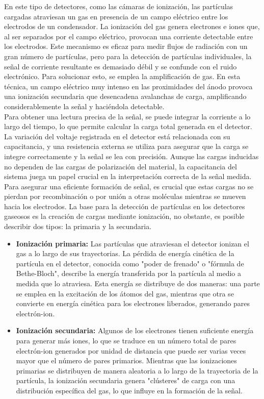 \documentclass{article}
\begin{document}
\noindent En este tipo de detectores, como las cámaras de ionización, las partículas cargadas atraviesan un gas en presencia de un campo eléctrico entre los electrodos de un condensador. La ionización del gas genera electrones e iones que, al ser separados por el campo eléctrico, provocan una corriente detectable entre los electrodos. Este mecanismo es eficaz para medir flujos de radiación con un gran número de partículas, pero para la detección de partículas individuales, la señal de corriente resultante es demasiado débil y se confunde con el ruido electrónico. Para solucionar esto, se emplea la amplificación de gas. En esta técnica, un campo eléctrico muy intenso en las proximidades del ánodo provoca una ionización secundaria que desencadena avalanchas de carga, amplificando considerablemente la señal y haciéndola detectable.\\

\noindent Para obtener una lectura precisa de la señal, se puede integrar la corriente a lo largo del tiempo, lo que permite calcular la carga total generada en el detector. La variación del voltaje registrada en el detector está relacionada con su capacitancia, y una resistencia externa se utiliza para asegurar que la carga se integre correctamente y la señal se lea con precisión. Aunque las cargas inducidas no dependen de las cargas de polarización del material, la capacitancia del sistema juega un papel crucial en la interpretación correcta de la señal medida.\\

\noindent Para asegurar una eficiente formación de señal, es crucial que estas cargas no se pierdan por recombinación o por unión a otras moléculas mientras se mueven hacia los electrodos. La base para la detección de partículas en los detectores gaseosos es la creación de cargas mediante ionización, no obstante, es posible describir dos tipos: la primaria y la secundaria.
\begin{itemize}
    \item \textbf{Ionización primaria:} Las partículas que atraviesan el detector ionizan el gas a lo largo de sus trayectorias. La pérdida de energía cinética de la partícula en el detector, conocida como "poder de frenado" o "fórmula de Bethe-Bloch", describe la energía transferida por la partícula al medio a medida que lo atraviesa. Esta energía se distribuye de dos maneras: una parte se emplea en la excitación de los átomos del gas, mientras que otra se convierte en energía cinética para los electrones liberados, generando pares electrón-ion.
    \item \textbf{Ionización secundaria:} Algunos de los electrones tienen suficiente energía para generar más iones, lo que se traduce en un número total de pares electrón-ion generados por unidad de distancia que puede ser varias veces mayor que el número de pares primarios. Mientras que las ionizaciones primarias se distribuyen de manera aleatoria a lo largo de la trayectoria de la partícula, la ionización secundaria genera "clústeres" de carga con una distribución específica del gas, lo que influye en la formación de la señal.  
\end{itemize}
\end{document}
